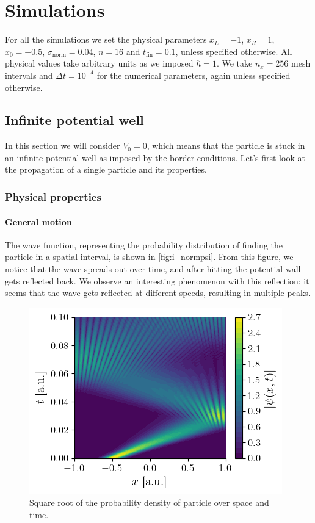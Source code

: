 \section{Simulations}

For all the simulations we set the physical parameters \(x_L = -1\), \(x_R = 1\), \(x_0 = -0.5\), \(\sigma_\textrm{norm} = 0.04\), \(n = 16\) and \(t_\textrm{fin} = 0.1\), unless specified otherwise. All physical values take arbitrary units as we imposed \(\hbar = 1\). We take \(n_x = 256\) mesh intervals and \(\Delta t = 10^{-4}\) for the numerical parameters, again unless specified otherwise.

\subsection{Infinite potential well}

In this section we will consider \(V_0 = 0\), which means that the particle is stuck in an infinite potential well as imposed by the border conditions. Let's first look at the propagation of a single particle and its properties.

\subsubsection{Physical properties}

\paragraph{General motion} The wave function, representing the probability distribution of finding the particle in a spatial interval, is shown in \autoref{fig:i_normpsi}. From this figure, we notice that the wave spreads out over time, and after hitting the potential wall gets reflected back. We observe an interesting phenomenon with this reflection: it seems that the wave gets reflected at different speeds, resulting in multiple peaks.

\begin{figure}[h]
    \centering
    \includegraphics[width=0.6\linewidth]{figures/i_normpsi.png}
    \caption{Square root of the probability density of particle over space and time.}
    \label{fig:i_normpsi}
\end{figure}

